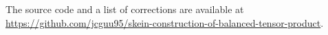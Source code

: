 \renewcommand{\bibfont}{\tiny} %
\printbibliography

{\tiny \noindent The source code and a list of corrections are available at
  \url{https://github.com/jcguu95/skein-construction-of-balanced-tensor-product}.}


